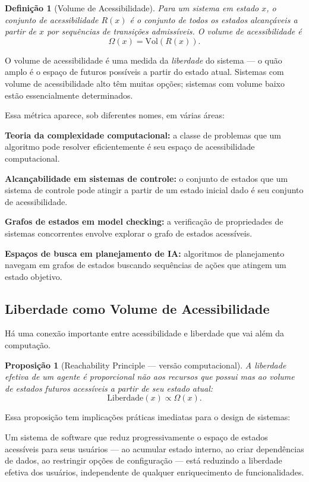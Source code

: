 \documentclass[11pt, a4paper]{article}
\theoremstyle{named}
\newtheorem{proposicao}{Proposição}
\newtheorem{definicao}{Definição}
\begin{document}
\begin{definicao}[Volume de Acessibilidade]
Para um sistema em estado $x$, o conjunto de acessibilidade $R(x)$
é o conjunto de todos os estados alcançáveis a partir de $x$ por
sequências de transições admissíveis. O volume de acessibilidade é
\[
  \Omega(x) = \mathrm{Vol}(R(x)).
\]
\end{definicao}

O volume de acessibilidade é uma medida da \emph{liberdade} do sistema
— o quão amplo é o espaço de futuros possíveis a partir do estado atual.
Sistemas com volume de acessibilidade alto têm muitas opções; sistemas
com volume baixo estão essencialmente determinados.

Essa métrica aparece, sob diferentes nomes, em várias áreas:

\textbf{Teoria da complexidade computacional:} a classe de problemas
que um algoritmo pode resolver eficientemente é seu espaço de
acessibilidade computacional.

\textbf{Alcançabilidade em sistemas de controle:} o conjunto de estados
que um sistema de controle pode atingir a partir de um estado inicial
dado é seu conjunto de acessibilidade.

\textbf{Grafos de estados em model checking:} a verificação de
propriedades de sistemas concorrentes envolve explorar o grafo de
estados acessíveis.

\textbf{Espaços de busca em planejamento de IA:} algoritmos de
planejamento navegam em grafos de estados buscando sequências de
ações que atingem um estado objetivo.

\subsection{Liberdade como Volume de Acessibilidade}

Há uma conexão importante entre acessibilidade e liberdade que vai
além da computação.

\begin{proposicao}[Reachability Principle — versão computacional]
A liberdade efetiva de um agente é proporcional não aos recursos que
possui mas ao volume de estados futuros acessíveis a partir de seu
estado atual:
\[
  \text{Liberdade}(x) \propto \Omega(x).
\]
\end{proposicao}

Essa proposição tem implicações práticas imediatas para o design de
sistemas:

Um sistema de software que reduz progressivamente o espaço de estados
acessíveis para seus usuários — ao acumular estado interno, ao criar
dependências de dados, ao restringir opções de configuração — está
reduzindo a liberdade efetiva dos usuários, independente de qualquer
enriquecimento de funcionalidades.
\end{document}
